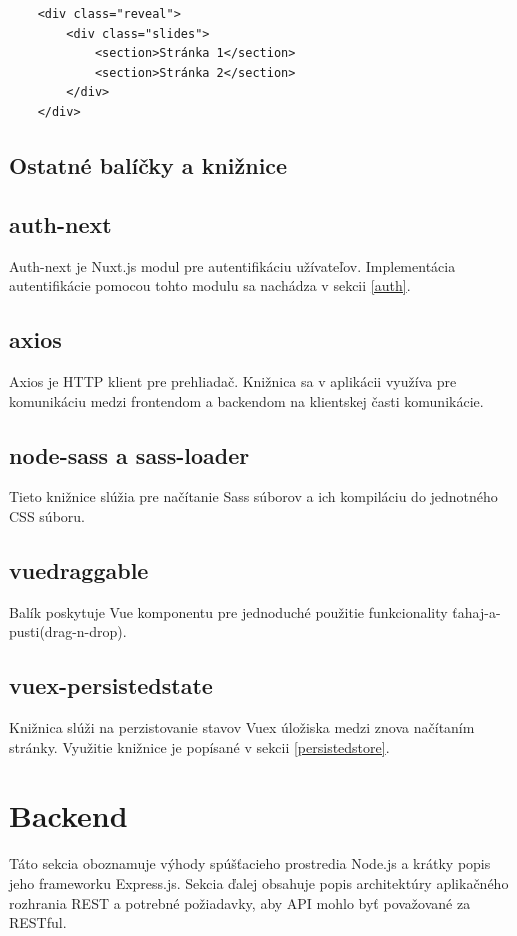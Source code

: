     \begin{verbatim}
    <div class="reveal">
        <div class="slides">
            <section>Stránka 1</section>
            <section>Stránka 2</section>
        </div>
    </div>
    \end{verbatim}


\subsection{Ostatné balíčky a knižnice}
\subsection*{auth-next}
Auth-next je Nuxt.js modul pre autentifikáciu užívateľov. Implementácia autentifikácie pomocou tohto modulu sa nachádza v sekcii \ref{auth}.

\subsection*{axios}
Axios je HTTP klient pre prehliadač. Knižnica sa v aplikácii využíva pre komunikáciu medzi frontendom a backendom na klientskej časti komunikácie. 

\subsection*{node-sass a sass-loader}
Tieto knižnice slúžia pre načítanie Sass súborov a ich kompiláciu do jednotného CSS súboru.

\subsection*{vuedraggable}
Balík poskytuje Vue komponentu pre jednoduché použitie funkcionality ťahaj-a-pusti(drag-n-drop).

\subsection*{vuex-persistedstate}
Knižnica slúži na perzistovanie stavov Vuex úložiska medzi znova načítaním stránky. Využitie knižnice je popísané v sekcii \ref{persistedstore}.

\section{Backend}
Táto sekcia oboznamuje výhody spúšťacieho prostredia Node.js a krátky popis jeho frameworku Express.js. Sekcia ďalej obsahuje popis architektúry aplikačného rozhrania REST a potrebné požiadavky, aby API mohlo byť považované za RESTful. 


